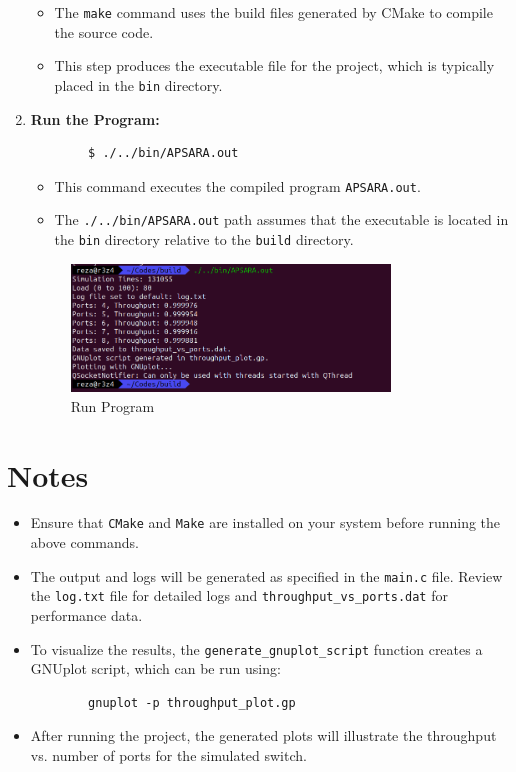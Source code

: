 \documentclass[12pt	]{article}
\begin{document}
\begin{enumerate}
	\begin{itemize}
		\item The \texttt{make} command uses the build files generated by CMake to compile the source code.
		\item This step produces the executable file for the project, which is typically placed in the \texttt{bin} directory.
	\end{itemize}
	
	\item \textbf{Run the Program:}
	\begin{verbatim}
		$ ./../bin/APSARA.out
	\end{verbatim}
	\begin{itemize}
		\item This command executes the compiled program \texttt{APSARA.out}.
		\item The \texttt{./../bin/APSARA.out} path assumes that the executable is located in the \texttt{bin} directory relative to the \texttt{build} directory.
	\end{itemize}
	
	\begin{figure}[h!]
		\centering
		\includegraphics[width=0.8\textwidth]{Images/img4.png}
		\caption{Run Program}
		\label{fig:Run Program}
	\end{figure}
\end{enumerate}

\section{Notes}
\begin{itemize}
	\item Ensure that \texttt{CMake} and \texttt{Make} are installed on your system before running the above commands.
	\item The output and logs will be generated as specified in the \texttt{main.c} file. Review the \texttt{log.txt} file for detailed logs and \texttt{throughput\_vs\_ports.dat} for performance data.
	\item To visualize the results, the \texttt{generate\_gnuplot\_script} function creates a GNUplot script, which can be run using:
	\begin{verbatim}
		gnuplot -p throughput_plot.gp
	\end{verbatim}
	\item After running the project, the generated plots will illustrate the throughput vs. number of ports for the simulated switch.
\end{itemize}
\end{document}
